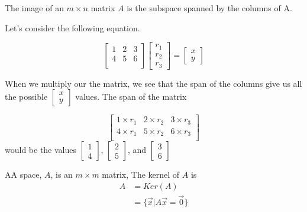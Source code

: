   \begin{definition}
    The image of an $m\times n$ matrix $A$ is the subspace spanned by the columns of A.
  \end{definition}

  \begin{problem}

    Let's consider the following equation. 

    \[
      \begin{bmatrix}
        1&2&3\\4&5&6\\
      \end{bmatrix}
      \begin{bmatrix}
        r_1\\r_2\\r_3
      \end{bmatrix}
      =
      \begin{bmatrix}
        x\\y
      \end{bmatrix}
    \]

    When we multiply our the matrix, we see that the span of the columns give us all the possible $\left[\begin{smallmatrix}x\\y\end{smallmatrix}\right]$ values. The span of the matrix 

    \[
      \begin{bmatrix}
        1\times r_1&2\times r_2&3\times r_3\\
        4\times r_1&5\times r_2&6\times r_3\\
      \end{bmatrix}
    \]
    would be the values $\left[\begin{smallmatrix}1\\4\end{smallmatrix}\right]$, $\left[\begin{smallmatrix}2\\5\end{smallmatrix}\right]$, and $\left[\begin{smallmatrix}3\\6\end{smallmatrix}\right]$
  \end{problem}

  \begin{definition}
    AA space, $A$, is an $m\times m$ matrix, The kernel of $A$ is 
    \begin{align*}
      A&=Ker(A)\\
      &=\{\vec{x}|A\vec{x}=\vec{0}\}
    \end{align*}
  \end{definition}


